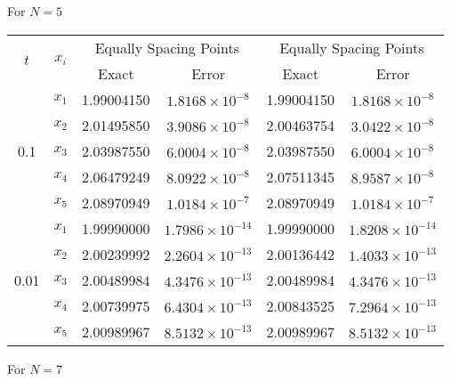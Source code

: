 \documentclass[12pt, a4paper]{article}
\begin{document}
For \( N = 5 \)

\begin{table}[ht]
	\renewcommand{\arraystretch}{1.5}
	\centering
	\begin{tabular}{|c|c|c|c|c|c|}
		\hline
		\multirow{2}{*}{\( t \)} & \multirow{2}{*}{\( x_i \)} & \multicolumn{2}{c|}{Equally Spacing Points} & \multicolumn{2}{c|}{Equally Spacing Points} \\
		\cline{3-6}
		& & Exact & Error & Exact & Error \\
		\hline
		\multirow{5}{*}{0.1} & \( x_1 \) & 1.99004150 & \( 1.8168 \times 10^{-8} \) & 1.99004150 & \( 1.8168 \times 10^{-8} \) \\
		& \( x_2 \) & 2.01495850 & \( 3.9086 \times 10^{-8} \) & 2.00463754 & \( 3.0422 \times 10^{-8} \) \\
		& \( x_3 \) & 2.03987550 & \( 6.0004 \times 10^{-8} \) & 2.03987550 & \( 6.0004 \times 10^{-8} \) \\
		& \( x_4 \) & 2.06479249 & \( 8.0922 \times 10^{-8} \) & 2.07511345 & \( 8.9587 \times 10^{-8} \) \\
		& \( x_5 \) & 2.08970949 & \( 1.0184 \times 10^{-7} \) & 2.08970949 & \( 1.0184 \times 10^{-7} \) \\
		\hline
		\multirow{5}{*}{0.01} & \( x_1 \) & 1.99990000 & \( 1.7986 \times 10^{-14} \) & 1.99990000 & \( 1.8208 \times 10^{-14} \) \\
		& \( x_2 \) & 2.00239992 & \( 2.2604 \times 10^{-13} \) & 2.00136442 & \( 1.4033 \times 10^{-13} \) \\
		& \( x_3 \) & 2.00489984 & \( 4.3476 \times 10^{-13} \) & 2.00489984 & \( 4.3476 \times 10^{-13} \) \\
		& \( x_4 \) & 2.00739975 & \( 6.4304 \times 10^{-13} \) & 2.00843525 & \( 7.2964 \times 10^{-13} \) \\
		& \( x_5 \) & 2.00989967 & \( 8.5132 \times 10^{-13} \) & 2.00989967 & \( 8.5132 \times 10^{-13} \) \\
		\hline
	\end{tabular}
\end{table}

For \( N = 7 \)
\end{document}
